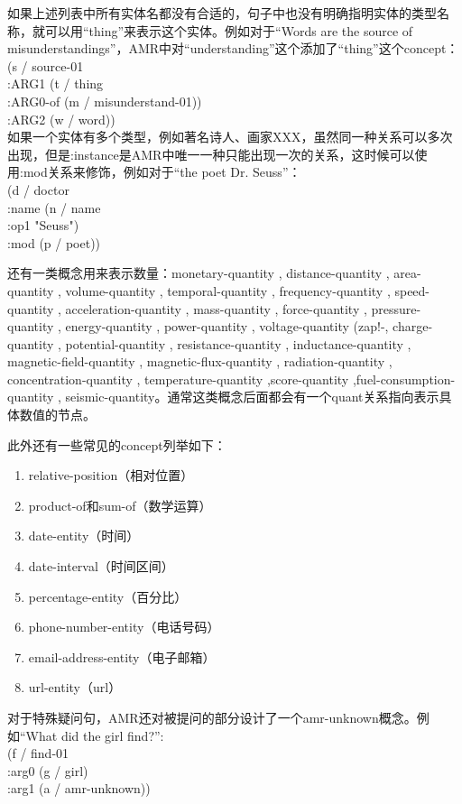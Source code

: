 \documentclass[master, winfont]{njuthesis}
\begin{document}
如果上述列表中所有实体名都没有合适的，句子中也没有明确指明实体的类型名称，就可以用“thing”来表示这个实体。例如对于“Words are the source of misunderstandings”，AMR中对“understanding”这个添加了“thing”这个concept：\\
(s / source-01\\
      :ARG1 (t / thing\\
            :ARG0-of (m / misunderstand-01))\\
      :ARG2 (w / word))\\

如果一个实体有多个类型，例如著名诗人、画家XXX，虽然同一种关系可以多次出现，但是:instance是AMR中唯一一种只能出现一次的关系，这时候可以使用:mod关系来修饰，例如对于“the poet Dr. Seuss”：\\
(d / doctor \\
	 :name (n / name \\
	 	    :op1 "Seuss")\\
	 :mod (p / poet))

还有一类概念用来表示数量：monetary-quantity , distance-quantity , area-quantity , volume-quantity , temporal-quantity , frequency-quantity , speed-quantity , acceleration-quantity , mass-quantity , force-quantity , pressure-quantity , energy-quantity , power-quantity , voltage-quantity (zap!-, charge-quantity , potential-quantity , resistance-quantity , inductance-quantity , magnetic-field-quantity , magnetic-flux-quantity , radiation-quantity , concentration-quantity , temperature-quantity ,score-quantity ,fuel-consumption-quantity , seismic-quantity。通常这类概念后面都会有一个quant关系指向表示具体数值的节点。

此外还有一些常见的concept列举如下：
\begin{enumerate}
	\item relative-position（相对位置）
	\item product-of和sum-of（数学运算）
	\item date-entity（时间）
	\item date-interval（时间区间）
	\item percentage-entity（百分比）
	\item phone-number-entity（电话号码）
	\item email-address-entity（电子邮箱）
	\item url-entity（url）
\end{enumerate}

对于特殊疑问句，AMR还对被提问的部分设计了一个amr-unknown概念。例如“What did the girl find?”:\\
  (f / find-01\\
    :arg0 (g / girl)\\
    :arg1 (a / amr-unknown))
\end{document}
